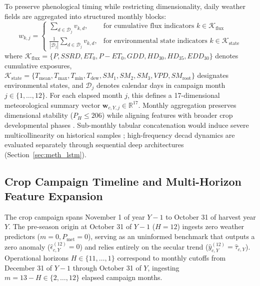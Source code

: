 To preserve phenological timing while restricting dimensionality, daily weather fields are aggregated into structured monthly blocks:
\begin{equation}
    w_{k, j} = 
    \begin{cases}
        \displaystyle \sum_{d \in \mathcal{D}_j} v_{k, d}, & \text{for cumulative flux indicators } k \in \mathcal{K}_{\text{flux}} \\[2.5ex]
        \displaystyle \frac{1}{|\mathcal{D}_j|} \sum_{d \in \mathcal{D}_j} v_{k, d}, & \text{for environmental state indicators } k \in \mathcal{K}_{\text{state}}
    \end{cases}
    \label{eq:monthly_aggregation_rule}
\end{equation}
where $\mathcal{K}_{\text{flux}} = \{P, SSRD, ET_0, P-ET_0, GDD, HD_{30}, HD_{35}, EDD_{30}\}$ denotes cumulative exposures, $\mathcal{K}_{\text{state}} = \{T_{\text{mean}}, T_{\text{max}}, T_{\text{min}}, T_{\text{dew}}, SM_1, SM_2, SM_3, VPD, SM_{\text{root}}\}$ designates environmental states, and $\mathcal{D}_j$ denotes calendar days in campaign month $j \in \{1, \dots, 12\}$. For each elapsed month $j$, this defines a 17-dimensional meteorological summary vector $\mathbf{w}_{c,Y,j} \in \mathbb{R}^{17}$. Monthly aggregation preserves dimensional stability ($P_H \le 206$) while aligning features with broader crop developmental phases \citep{Hoffman2020}. Sub-monthly tabular concatenation would induce severe multicollinearity on historical samples \citep{Sharmaetal2025}; high-frequency decad dynamics are evaluated separately through sequential deep architectures (Section~\ref{sec:meth_lstm}).

\subsection{Crop Campaign Timeline and Multi-Horizon Feature Expansion}
\label{sec:meth_timeline_horizons}

The crop campaign spans November 1 of year $Y-1$ to October 31 of harvest year $Y$. The pre-season origin at October 31 of $Y-1$ ($H=12$) ingests zero weather predictors ($m=0, P_{\text{met}}=0$), serving as an uninformed benchmark that outputs a zero anomaly ($\hat{\epsilon}_{c,Y}^{(12)} = 0$) and relies entirely on the secular trend ($\hat{y}_{c,Y}^{(12)} = \hat{\tau}_{c,Y}$). Operational horizons $H \in \{11, \dots, 1\}$ correspond to monthly cutoffs from December 31 of $Y-1$ through October 31 of $Y$, ingesting $m = 13 - H \in \{2, \dots, 12\}$ elapsed campaign months.

